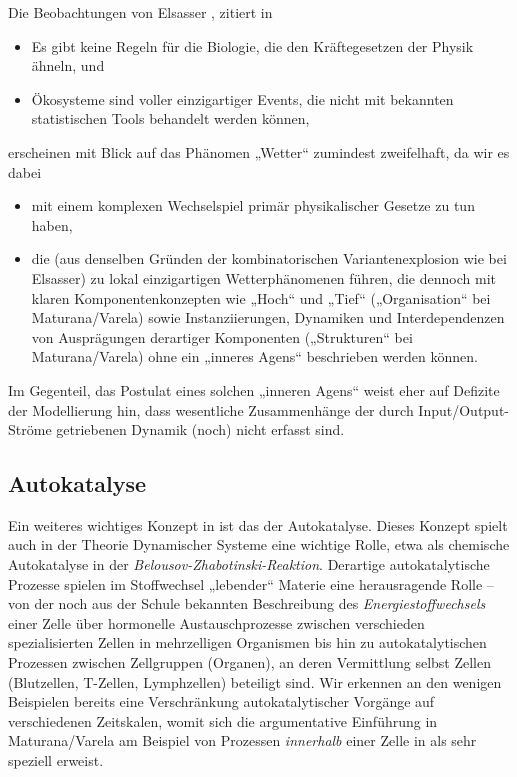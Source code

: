 \documentclass[11pt,a4paper]{article}
\begin{document}
Die Beobachtungen von Elsasser \cite{Elsasser1981}, zitiert in
\cite{Ulanowicz2009}
\begin{itemize}[noitemsep]
\item Es gibt keine Regeln für die Biologie, die den Kräftegesetzen der Physik
  ähneln, und
\item Ökosysteme sind voller einzigartiger Events, die nicht mit bekannten
  statistischen Tools behandelt werden können,
\end{itemize}
erscheinen mit Blick auf das Phänomen „Wetter“ zumindest zweifelhaft,
da wir es dabei 
\begin{itemize}[noitemsep]
\item mit einem komplexen Wechselspiel primär physikalischer Gesetze zu tun
  haben,
\item die (aus denselben Gründen der kombinatorischen Variantenexplosion wie
  bei Elsasser) zu lokal einzigartigen Wetterphänomenen führen, die dennoch
  mit klaren Komponentenkonzepten wie „Hoch“ und „Tief“ („Organisation“ bei
  Maturana/Varela) sowie Instanziierungen, Dynamiken und Interdependenzen von
  Ausprägungen derartiger Komponenten („Strukturen“ bei Maturana/Varela) ohne
  ein „inneres Agens“ beschrieben werden können.
\end{itemize}
Im Gegenteil, das Postulat eines solchen „inneren Agens“ weist eher auf
Defizite der Modellierung hin, dass wesentliche Zusammenhänge der durch
Input/Output-Ströme getriebenen Dynamik (noch) nicht erfasst sind.

\subsection{Autokatalyse}

Ein weiteres wichtiges Konzept in \cite{Ulanowicz2009} ist das der
Autokatalyse.  Dieses Konzept spielt auch in der Theorie Dynamischer Systeme
eine wichtige Rolle, etwa als chemische Autokatalyse in der
\emph{Belousov-Zhabotinski-Reaktion}.  Derartige autokatalytische Prozesse
spielen im Stoffwechsel „lebender“ Materie eine herausragende Rolle -- von der
noch aus der Schule bekannten Beschreibung des \emph{Energiestoffwechsels}
einer Zelle über hormonelle Austauschprozesse zwischen verschieden
spezialisierten Zellen in mehrzelligen Organismen bis hin zu autokatalytischen
Prozessen zwischen Zellgruppen (Organen), an deren Vermittlung selbst Zellen
(Blutzellen, T-Zellen, Lymphzellen) beteiligt sind. Wir erkennen an den
wenigen Beispielen bereits eine Verschränkung autokatalytischer Vorgänge auf
verschiedenen Zeitskalen, womit sich die argumentative Einführung in
Maturana/Varela am Beispiel von Prozessen \emph{innerhalb} einer Zelle in
\cite{Mingers1989} als sehr speziell erweist.
\end{document}
